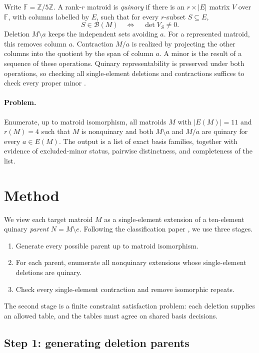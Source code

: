 \documentclass[11pt,letterpaper,titlepage]{article}
\def\F{\mathbb{F}}
\def\B{\mathcal{B}}
\begin{document}
Write \(\F=\mathbb{Z}/5\mathbb{Z}\). A rank-\(r\) matroid is \emph{quinary} if there is an \(r\times |E|\) matrix \(V\) over \(\F\), with columns labelled by \(E\), such that for every \(r\)-subset \(S\subseteq E\),
\[
 S\in\B(M)\quad\Longleftrightarrow\quad\det V_S\ne 0.
\]
Deletion \(M\setminus a\) keeps the independent sets avoiding \(a\). For a represented matroid, this removes column \(a\). Contraction \(M/a\) is realized by projecting the other columns into the quotient by the span of column \(a\). A minor is the result of a sequence of these operations. Quinary representability is preserved under both operations, so checking all single-element deletions and contractions suffices to check every proper minor \cite{oxley}.

\paragraph{Problem.}
Enumerate, up to matroid isomorphism, all matroids \(M\) with \(|E(M)|=11\) and \(r(M)=4\) such that \(M\) is nonquinary and both \(M\setminus a\) and \(M/a\) are quinary for every \(a\in E(M)\). The output is a list of exact basis families, together with evidence of excluded-minor status, pairwise distinctness, and completeness of the list.

\section{Method}
\label{sec:method}

We view each target matroid \(M\) as a single-element extension of a ten-element quinary \emph{parent} \(N=M\setminus e\). Following the classification paper \cite{classification-paper}, we use three stages.
\begin{enumerate}
\item Generate every possible parent up to matroid isomorphism.
\item For each parent, enumerate all nonquinary extensions whose single-element deletions are quinary.
\item Check every single-element contraction and remove isomorphic repeats.
\end{enumerate}
The second stage is a finite constraint satisfaction problem: each deletion supplies an allowed table, and the tables must agree on shared basis decisions.

\subsection{Step 1: generating deletion parents}
\end{document}
